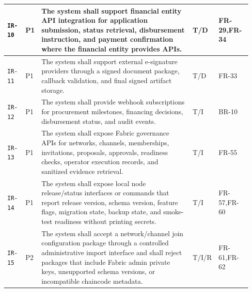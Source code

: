 \documentclass[11pt,a4paper]{article}
\begin{document}
\begin{footnotesize}
\begin{longtable}{@{}p{}p{}p{}p{}p{}@{}}
\texttt{IR-10} & P1 & The system shall support financial entity API integration for application submission, status retrieval, disbursement instruction, and payment confirmation where the financial entity provides APIs. & T/D & FR-29,FR-34 \\ \hline
\texttt{IR-11} & P1 & The system shall support external e-signature providers through a signed document package, callback validation, and final signed artifact storage. & T/D & FR-33 \\ \hline
\texttt{IR-12} & P1 & The system shall provide webhook subscriptions for procurement milestones, financing decisions, disbursement status, and audit events. & T/I & BR-10 \\ \hline
\texttt{IR-13} & P1 & The system shall expose Fabric governance APIs for networks, channels, memberships, invitations, proposals, approvals, readiness checks, operator execution records, and sanitized evidence retrieval. & T/I & FR-55 \\ \hline
\texttt{IR-14} & P1 & The system shall expose local node release/status interfaces or commands that report release version, schema version, feature flags, migration state, backup state, and smoke-test readiness without printing secrets. & T/I & FR-57,FR-60 \\ \hline
\texttt{IR-15} & P2 & The system shall accept a network/channel join configuration package through a controlled administrative import interface and shall reject packages that include Fabric admin private keys, unsupported schema versions, or incompatible chaincode metadata. & T/I/R & FR-61,FR-62 \\ \hline
\end{longtable}
\end{footnotesize}
\end{document}
